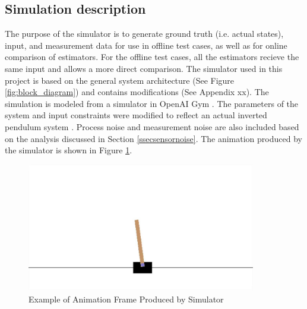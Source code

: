 \documentclass{article}
\begin{document}
\subsection{Simulation description}
The purpose of the simulator is to generate ground truth (i.e. actual states), input, and measurement data for use in offline test cases, as well as for online comparison of estimators.  For the offline test cases, all the estimators recieve the same input and allows a more direct comparison. The simulator used in this project is based on the general system architecture (See Figure \ref{fig:block_diagram}) and contains modifications (See Appendix xx).  The simulation is modeled from a simulator in OpenAI Gym \cite{OpenAI}. The parameters of the system and input constraints were modified to reflect an actual inverted pendulum system \cite{lab6}. Process noise and measurement noise are also included based on the analysis discussed in Section \ref{ssecsensornoise}.  The animation produced by the simulator is shown in Figure \ref{fig:simulator}.
\begin{figure}
	\centering
	\includegraphics[width=10cm,keepaspectratio]{Simulator.jpg}
	\caption{Example of Animation Frame Produced by Simulator}
	\label{fig:simulator}
\end{figure}
\end{document}
